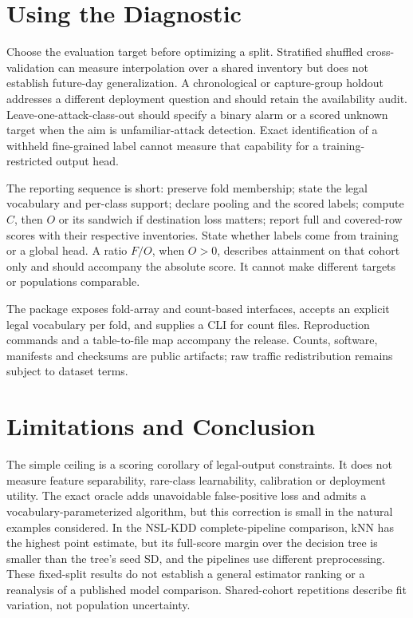 \documentclass[journal]{IEEEtran}
\begin{document}
\section{Using the Diagnostic}
Choose the evaluation target before optimizing a split. Stratified shuffled cross-validation can measure interpolation over a shared inventory but does not establish future-day generalization. A chronological or capture-group holdout addresses a different deployment question and should retain the availability audit. Leave-one-attack-class-out should specify a binary alarm or a scored unknown target when the aim is unfamiliar-attack detection. Exact identification of a withheld fine-grained label cannot measure that capability for a training-restricted output head.

The reporting sequence is short: preserve fold membership; state the legal vocabulary and per-class support; declare pooling and the scored labels; compute \(C\), then \(O\) or its sandwich if destination loss matters; report full and covered-row scores with their respective inventories. State whether labels come from training or a global head. A ratio \(F/O\), when \(O>0\), describes attainment on that cohort only and should accompany the absolute score. It cannot make different targets or populations comparable.

The package exposes fold-array and count-based interfaces, accepts an explicit legal vocabulary per fold, and supplies a CLI for count files. Reproduction commands and a table-to-file map accompany the release. Counts, software, manifests and checksums are public artifacts; raw traffic redistribution remains subject to dataset terms.

\section{Limitations and Conclusion}
The simple ceiling is a scoring corollary of legal-output constraints. It does not measure feature separability, rare-class learnability, calibration or deployment utility. The exact oracle adds unavoidable false-positive loss and admits a vocabulary-parameterized algorithm, but this correction is small in the natural examples considered. In the NSL-KDD complete-pipeline comparison, kNN has the highest point estimate, but its full-score margin over the decision tree is smaller than the tree's seed SD, and the pipelines use different preprocessing. These fixed-split results do not establish a general estimator ranking or a reanalysis of a published model comparison. Shared-cohort repetitions describe fit variation, not population uncertainty.
\end{document}
